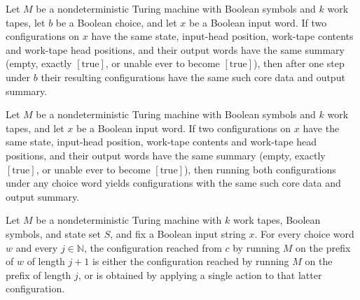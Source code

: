 \begin{theorem}
\label{Turing.NDTM.coreSum_stepWith}
\leanok
{}
Let $M$ be a nondeterministic Turing machine with Boolean symbols and $k$ work tapes,
let $b$ be a Boolean choice, and let $x$ be a Boolean input word. If two configurations
on $x$ have the same state, input-head position, work-tape contents and work-tape head
positions, and their output words have the same summary (empty, exactly
$[\mathrm{true}]$, or unable ever to become $[\mathrm{true}]$), then after one step
under $b$ their resulting configurations have the same such core data and output
summary.
\end{theorem}

\begin{theorem}
\label{Turing.NDTM.coreSum_runWith}
\leanok
{}
Let $M$ be a nondeterministic Turing machine with Boolean symbols and $k$ work tapes,
and let $x$ be a Boolean input word. If two configurations on $x$ have the same state,
input-head position, work-tape contents and work-tape head positions, and their output
words have the same summary (empty, exactly $[\mathrm{true}]$, or unable ever to become
$[\mathrm{true}]$), then running both configurations under any choice word yields
configurations with the same such core data and output summary.
\end{theorem}

\begin{theorem}
\label{Turing.NDTM.take_succ_action}
\leanok
{}
Let $M$ be a nondeterministic Turing machine with $k$ work tapes, Boolean symbols, and
state set $S$, and fix a Boolean input string $x$. For every choice word $w$ and every
$j\in\mathbb{N}$, the configuration reached from $c$ by running $M$ on the prefix of $w$
of length $j+1$ is either the configuration reached by running $M$ on the prefix of
length $j$, or is obtained by applying a single action to that latter configuration.
\end{theorem}

